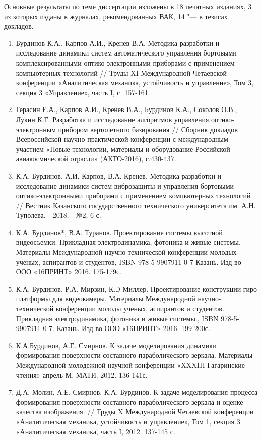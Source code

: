 {\publications} Основные результаты по теме диссертации изложены в 18 печатных изданиях,
    3 из которых изданы в журналах, рекомендованных ВАК,
    14 "--- в тезисах докладов.
    
\begin{enumerate}
  \item Бурдинов К.А., Карпов А.И., Кренев В.А.   Методика разработки и исследование динамики систем автоматического управления бортовыми комплексированными оптико-электронными приборами с применением компьютерных технологий // Труды XI Международной Четаевской конференции «Аналитическая механика, устойчивость и управление», Том 3, секция 3 «Управление», часть I, с. 157-161.
  \item Герасин Е.А., Карпов А.И., Кренев В.А., Бурдинов К.А., Соколов О.В., Лукин К.Г. Разработка и исследование алгоритмов управления оптико-электронным прибором вертолетного базирования // Сборник докладов Всероссийской научно-практической конференции с международным участием «Новые технологии, материалы и оборудование Российской авиакосмической отрасли» (АКТО-2016), с.430-437.
  \item К.А. Бурдинов, А.И. Карпов, В.А. Кренев. Методика разработки и исследование динамики систем виброзащиты и управления бортовыми оптико-электронными приборами с применением компьютерных технологий // Вестник Казанского государственного технического университета им. А.Н. Туполева. - 2018. - №2, 6 с.
  \item К.А. Бурдинов*, В.А. Туранов. Проектирование системы высотной видеосъемки. Прикладная электродинамика, фотоника и живые системы. Материалы Международной научно-технической конференции молодых ученых, аспирантов и студентов, ISBN 978-5-9907911-0-7
Казань. Изд-во ООО «16ПРИНТ» 2016. 175-179с.
  \item К.А. Бурдинов, Р.А. Мирзин, К.Э Миллер. Проектирование конструкции гиро платформы для видеокамеры. Материалы Международной научно-технической конференции молоды ученых, аспирантов и студентов. Прикладная электродинамика, фотоника и живые системы., ISBN 978-5-9907911-0-7. Казань. Изд-во ООО «16ПРИНТ» 2016. 199-200с.
  \item К.А.Бурдинов, А.Е. Смирнов. К задаче моделирования динамики формирования поверхности составного параболического зеркала. Материалы Международной молодежной научной конференции «XXXIII Гагаринские чтения» апрель М. МАТИ. 2012. 136-141с.
  \item Д.А. Молин, А.Е. Смирнов, К.А. Бурдинов. К задаче моделирования процесса формирования поверхности составного параболического зеркала и оценке качества изображения. // Труды X Международной Четаевской конференции «Аналитическая механика, устойчивость и управление», Том 1, секция 3 «Аналитическая механика, часть I, 2012. 137-145 с.

\end{enumerate}
